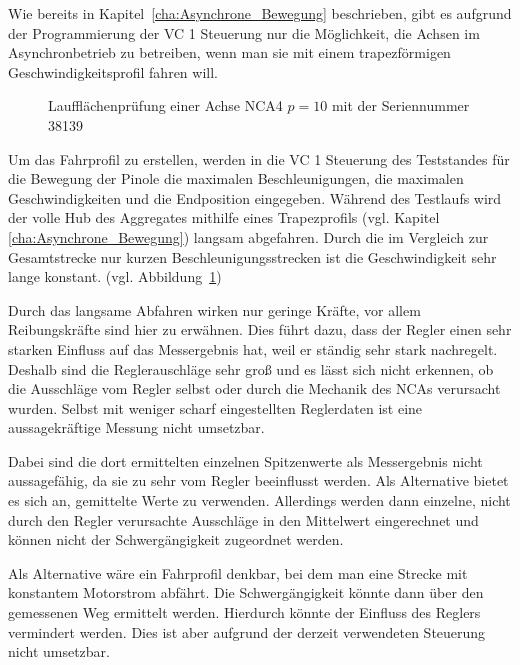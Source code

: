 Wie bereits in Kapitel~\ref{cha:Asynchrone_Bewegung} beschrieben, gibt es aufgrund der Programmierung der VC 1 Steuerung nur die Möglichkeit, die Achsen im Asynchronbetrieb zu betreiben, wenn man sie mit einem trapezförmigen Geschwindigkeitsprofil fahren will. 


\begin{figure}[h]

\caption{Laufflächenprüfung einer Achse NCA4 $p=\num{10}$ mit der Seriennummer 38139}
\label{fig:Laufflaechenpruefung_einer_Achse}
\end{figure}

Um das Fahrprofil zu erstellen, werden in die VC 1 Steuerung des Teststandes für die Bewegung der Pinole die maximalen Beschleunigungen, die maximalen Geschwindigkeiten und die Endposition eingegeben. Während des Testlaufs wird der volle Hub des Aggregates mithilfe eines Trapezprofils (vgl. Kapitel \ref{cha:Asynchrone_Bewegung}) langsam abgefahren. Durch die im Vergleich zur Gesamtstrecke nur kurzen Beschleunigungsstrecken ist die Geschwindigkeit sehr lange konstant. (vgl. Abbildung~\ref{fig:Laufflaechenpruefung_einer_Achse}) 



Durch das langsame Abfahren wirken nur geringe Kräfte, vor allem Reibungskräfte sind hier zu erwähnen. Dies führt dazu, dass der Regler einen sehr starken Einfluss auf das Messergebnis hat, weil er ständig sehr stark nachregelt. Deshalb sind die Reglerauschläge sehr groß und es lässt sich nicht erkennen, ob die Ausschläge vom Regler selbst oder durch die Mechanik des NCAs verursacht wurden. Selbst mit weniger scharf eingestellten Reglerdaten ist eine aussagekräftige Messung nicht umsetzbar. 


Dabei sind die dort ermittelten einzelnen Spitzenwerte als Messergebnis nicht aussagefähig, da sie zu sehr vom Regler beeinflusst werden. Als Alternative bietet es sich an, gemittelte Werte zu verwenden. Allerdings werden dann einzelne, nicht durch den Regler verursachte Ausschläge in den Mittelwert eingerechnet und können nicht der Schwergängigkeit zugeordnet werden.



  

Als Alternative wäre ein Fahrprofil denkbar, bei dem man eine Strecke mit konstantem Motorstrom abfährt. Die Schwergängigkeit könnte dann über den gemessenen Weg ermittelt werden.  Hierdurch könnte der Einfluss des Reglers vermindert werden. Dies ist aber aufgrund der derzeit verwendeten Steuerung  nicht umsetzbar. 

